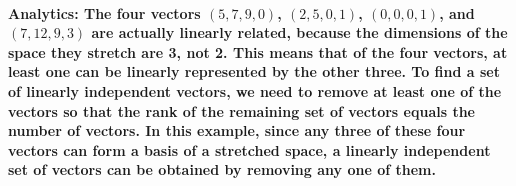 \documentclass[11pt]{article} %
\begin{document}
\paragraph{\textbf{Analytics:} The four vectors $(5,7,9,0)$, $(2,5,0,1)$, $(0,0,0,1)$, and $(7,12,9,3)$ are actually linearly related, because the dimensions of the space they stretch are 3, not 2. This means that of the four vectors, at least one can be linearly represented by the other three. To find a set of linearly independent vectors, we need to remove at least one of the vectors so that the rank of the remaining set of vectors equals the number of vectors. In this example, since any three of these four vectors can form a basis of a stretched space, a linearly independent set of vectors can be obtained by removing any one of them.}
% 
% 
% 
% 
% 
\end{document}
